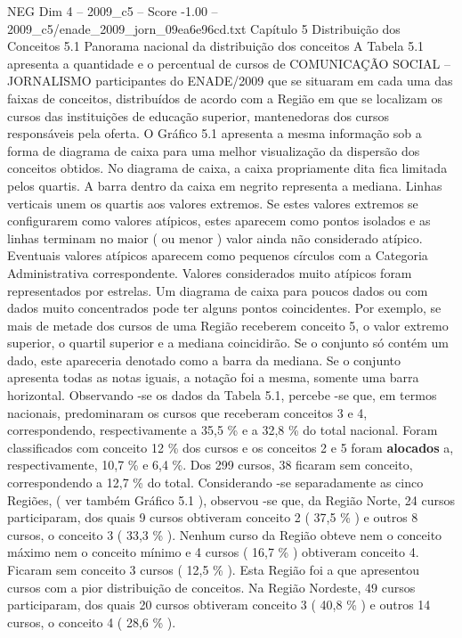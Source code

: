 \begin{textsample}{NEG Dim 4 – 2009\_c5 – Score -1.00 – 2009\_c5/enade\_2009\_jorn\_09ea6e96cd.txt}  \label{ex:f4_neg_083}
Capítulo 5 Distribuição dos Conceitos 5.1 Panorama nacional da distribuição dos conceitos A Tabela 5.1 apresenta a quantidade e o percentual de cursos de COMUNICAÇÃO SOCIAL – JORNALISMO participantes do ENADE/2009 que se situaram em cada uma das faixas de conceitos, distribuídos de acordo com a Região em que se localizam os cursos das instituições de educação superior, mantenedoras dos cursos responsáveis pela oferta.
O Gráfico 5.1 apresenta a mesma informação sob a forma de diagrama de caixa para uma melhor visualização da dispersão dos conceitos obtidos.
No diagrama de caixa, a caixa propriamente dita fica limitada pelos quartis.
A barra dentro da caixa em negrito representa a mediana.
Linhas verticais unem os quartis aos valores extremos.
Se estes valores extremos se configurarem como valores atípicos, estes aparecem como pontos isolados e as linhas terminam no maior ( ou menor ) valor ainda não considerado atípico.
Eventuais valores atípicos aparecem como pequenos círculos com a Categoria Administrativa correspondente.
Valores considerados muito atípicos foram representados por estrelas.
Um diagrama de caixa para poucos dados ou com dados muito concentrados pode ter alguns pontos coincidentes.
Por exemplo, se mais de metade dos cursos de uma Região receberem conceito 5, o valor extremo superior, o quartil superior e a mediana coincidirão.
Se o conjunto só contém um dado, este apareceria denotado como a barra da mediana.
Se o conjunto apresenta todas as notas iguais, a notação foi a mesma, somente uma barra horizontal.
Observando -se os dados da Tabela 5.1, percebe -se que, em termos nacionais, predominaram os cursos que receberam conceitos 3 e 4, correspondendo, respectivamente a 35,5 \% e a 32,8 \% do total nacional.
Foram classificados com conceito 12 \% dos cursos e os conceitos 2 e 5 foram \textbf{alocados} a, respectivamente, 10,7 \% e 6,4 \%.
Dos 299 cursos, 38 ficaram sem conceito, correspondendo a 12,7 \% do total.
Considerando -se separadamente as cinco Regiões, ( ver também Gráfico 5.1 ), observou -se que, da Região Norte, 24 cursos participaram, dos quais 9 cursos obtiveram conceito 2 ( 37,5 \% ) e outros 8 cursos, o conceito 3 ( 33,3 \% ).
Nenhum curso da Região obteve nem o conceito máximo nem o conceito mínimo e 4 cursos ( 16,7 \% ) obtiveram conceito 4.
Ficaram sem conceito 3 cursos ( 12,5 \% ).
Esta Região foi a que apresentou cursos com a pior distribuição de conceitos.
Na Região Nordeste, 49 cursos participaram, dos quais 20 cursos obtiveram conceito 3 ( 40,8 \% ) e outros 14 cursos, o conceito 4 ( 28,6 \% ).

\end{textsample}
